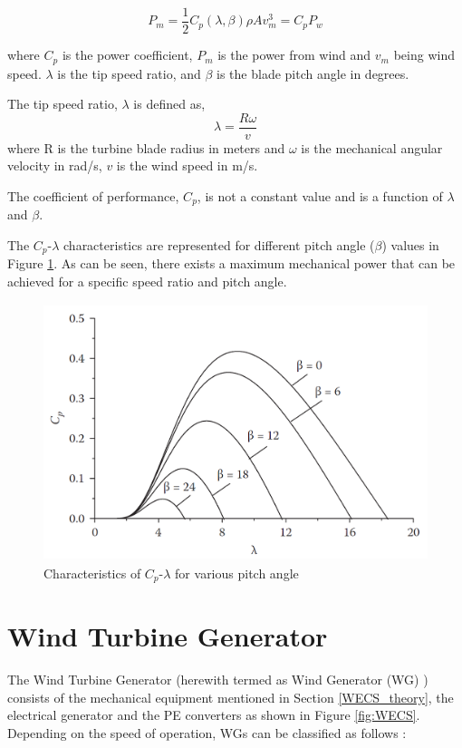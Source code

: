 \begin{equation}\label{windenergy}
    P_m =\frac{1}{2} C_p(\lambda,\beta) \rho A v_m^3 = C_p P_w
\end{equation}

where $C_p$ is the power coefficient, $P_m$ is the power from wind and $v_m$ being wind speed. $\lambda$ is the tip speed ratio, and $\beta$ is the blade pitch angle in degrees. 

The tip speed ratio, $\lambda$ is defined as,
\begin{equation}
\lambda= \frac{R\omega}{v} 
\end{equation}
where R is the turbine blade radius in meters and $\omega$ is the mechanical angular velocity in rad/s, $v$ is the wind speed in m/s.    

The coefficient of performance, $C_p$, is not a constant value and is a function of $\lambda$ and $\beta$.

The $C_p$-$\lambda$ characteristics are represented for different pitch angle ($\beta$) values in Figure \ref{fig:pitchangle}. As can be seen, there exists a maximum mechanical power that can be achieved for a specific speed ratio and pitch angle.

\begin{figure}[H]
\centering
    \includegraphics[height = 7.5cm,width = 11.5cm]{Diagrams/Chapter_2/pitchangle_1.png}
    \caption{Characteristics of $C_p$-$\lambda$ for various pitch angle \cite{ali_wind_2012}}
    \label{fig:pitchangle}
\end{figure}

\section{Wind Turbine Generator}
The Wind Turbine Generator (herewith termed as Wind Generator (\gls{WG}) ) consists of the mechanical equipment mentioned in Section \ref{WECS_theory}, the electrical generator and the \gls{PE} converters as shown in Figure \ref{fig:WECS}. Depending on the speed of operation, \gls{WG}s can be classified as follows \cite{ali_wind_2012}:

